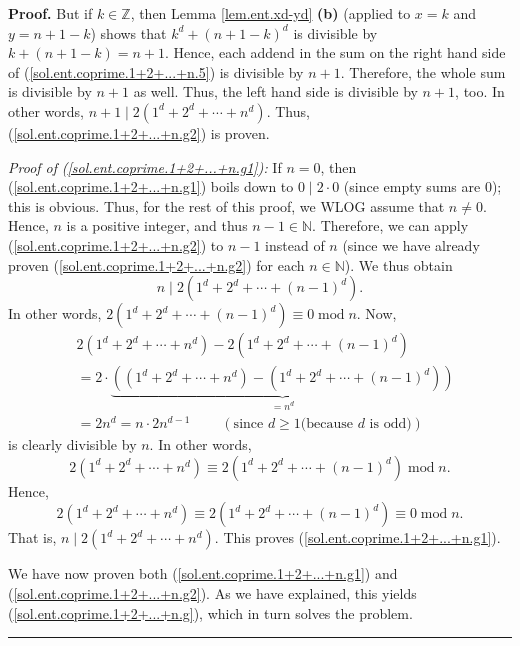 \documentclass[numbers=enddot,12pt,final,onecolumn,notitlepage]{scrartcl}%
\numberwithin{exer}{subsection}
\theoremstyle{definition}
\newenvironment{fineprint}{\begin{small}}{\end{small}}
\newenvironment{proof}[1][Proof]{\noindent\textbf{#1.} }{\ \rule{0.5em}{0.5em}}
\begin{document}
\begin{fineprint}
\begin{proof}
But if $k\in\mathbb{Z}$, then Lemma \ref{lem.ent.xd-yd} \textbf{(b)} (applied
to $x=k$ and $y=n+1-k$) shows that $k^{d}+\left(  n+1-k\right)  ^{d}$ is
divisible by $k+\left(  n+1-k\right)  =n+1$. Hence, each addend in the sum on
the right hand side of (\ref{sol.ent.coprime.1+2+...+n.5}) is divisible by
$n+1$. Therefore, the whole sum is divisible by $n+1$ as well. Thus, the left
hand side is divisible by $n+1$, too. In other words, $n+1\mid2\left(
1^{d}+2^{d}+\cdots+n^{d}\right)  $. Thus, (\ref{sol.ent.coprime.1+2+...+n.g2})
is proven.

\textit{Proof of} \textit{(\ref{sol.ent.coprime.1+2+...+n.g1}):} If $n=0$,
then (\ref{sol.ent.coprime.1+2+...+n.g1}) boils down to $0\mid2\cdot0$ (since
empty sums are $0$); this is obvious. Thus, for the rest of this proof, we
WLOG assume that $n\neq0$. Hence, $n$ is a positive integer, and thus
$n-1\in\mathbb{N}$. Therefore, we can apply
(\ref{sol.ent.coprime.1+2+...+n.g2}) to $n-1$ instead of $n$ (since we have
already proven (\ref{sol.ent.coprime.1+2+...+n.g2}) for each $n\in\mathbb{N}%
$). We thus obtain%
\[
n\mid2\left(  1^{d}+2^{d}+\cdots+\left(  n-1\right)  ^{d}\right)  .
\]
In other words, $2\left(  1^{d}+2^{d}+\cdots+\left(  n-1\right)  ^{d}\right)
\equiv0\operatorname{mod}n$. Now,%
\begin{align*}
&  2\left(  1^{d}+2^{d}+\cdots+n^{d}\right)  -2\left(  1^{d}+2^{d}%
+\cdots+\left(  n-1\right)  ^{d}\right) \\
&  =2\cdot\underbrace{\left(  \left(  1^{d}+2^{d}+\cdots+n^{d}\right)
-\left(  1^{d}+2^{d}+\cdots+\left(  n-1\right)  ^{d}\right)  \right)
}_{=n^{d}}\\
&  =2n^{d}=n\cdot2n^{d-1}\ \ \ \ \ \ \ \ \ \ \left(  \text{since }d\geq1\text{
(because }d\text{ is odd)}\right)
\end{align*}
is clearly divisible by $n$. In other words,%
\[
2\left(  1^{d}+2^{d}+\cdots+n^{d}\right)  \equiv2\left(  1^{d}+2^{d}%
+\cdots+\left(  n-1\right)  ^{d}\right)  \operatorname{mod}n.
\]
Hence,
\[
2\left(  1^{d}+2^{d}+\cdots+n^{d}\right)  \equiv2\left(  1^{d}+2^{d}%
+\cdots+\left(  n-1\right)  ^{d}\right)  \equiv0\operatorname{mod}n.
\]
That is, $n\mid2\left(  1^{d}+2^{d}+\cdots+n^{d}\right)  $. This proves
(\ref{sol.ent.coprime.1+2+...+n.g1}).

We have now proven both (\ref{sol.ent.coprime.1+2+...+n.g1}) and
(\ref{sol.ent.coprime.1+2+...+n.g2}). As we have explained, this yields
(\ref{sol.ent.coprime.1+2+...+n.g}), which in turn solves the problem.
\end{proof}
\end{fineprint}
\end{document}
